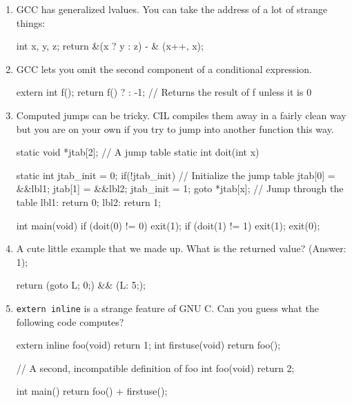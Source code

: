 \documentclass{article}
\def\t#1{{\tt #1}}
\begin{document}
\begin{enumerate}

\item GCC has generalized lvalues. You can take the address of a lot of
strange things:

\begin{cilcode}[local]
  int x, y, z;
  return &(x ? y : z) - & (x++, x);
\end{cilcode}

\item GCC lets you omit the second component of a conditional expression.

\begin{cilcode}[local]
  extern int f();
  return f() ? : -1; // Returns the result of f unless it is 0
\end{cilcode}

\item Computed jumps can be tricky. CIL compiles them away in a fairly clean
way but you are on your own if you try to jump into another function this way.

\begin{cilcode}[global]
static void *jtab[2]; // A jump table
static int doit(int x){
 
  static int jtab_init = 0;
  if(!jtab_init) { // Initialize the jump table
    jtab[0] = &&lbl1;
    jtab[1] = &&lbl2;
    jtab_init = 1;
  }
  goto *jtab[x]; // Jump through the table
lbl1:
  return 0;
lbl2:
  return 1;
}
 
int main(void){
  if (doit(0) != 0) exit(1);
  if (doit(1) != 1) exit(1);
  exit(0);
}
\end{cilcode}


\item A cute little example that we made up. What is the returned value?
(Answer: 1); 
\begin{cilcode}[local]
 return ({goto L; 0;}) && ({L: 5;});
\end{cilcode}

\item \t{extern inline} is a strange feature of GNU C. Can you guess what the
following code computes?

\begin{cilcode}[global]
extern inline foo(void) { return 1; }
int firstuse(void) { return foo(); }

// A second, incompatible definition of foo
int foo(void) { return 2; }

int main() {
    return foo() + firstuse();
}
\end{cilcode}


\end{enumerate}
\end{document}

